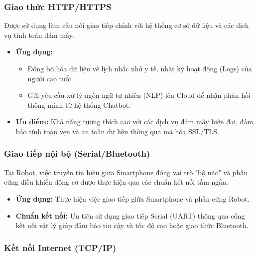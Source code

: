 \subsubsection{Giao thức HTTP/HTTPS}
Được sử dụng làm cầu nối giao tiếp chính với hệ thống cơ sở dữ liệu và các dịch vụ tính toán đám mây.
\begin{itemize}
    \item \textbf{Ứng dụng:} 
    \begin{itemize}
        \item Đồng bộ hóa dữ liệu về lịch nhắc nhở y tế, nhật ký hoạt động (Logs) của người cao tuổi.
        \item Gửi yêu cầu xử lý ngôn ngữ tự nhiên (NLP) lên Cloud để nhận phản hồi thông minh từ hệ thống Chatbot.
    \end{itemize}
    \item \textbf{Ưu điểm:} Khả năng tương thích cao với các dịch vụ đám mây hiện đại, đảm bảo tính toàn vẹn và an toàn dữ liệu thông qua mã hóa SSL/TLS.
\end{itemize}

\subsubsection{Giao tiếp nội bộ (Serial/Bluetooth)}
Tại Robot, việc truyền tín hiệu giữa Smartphone đóng vai trò "bộ não" và phần cứng điều khiển động cơ được thực hiện qua các chuẩn kết nối tầm ngắn.
\begin{itemize}
    \item \textbf{Ứng dụng:} Thực hiện việc giao tiếp giữa Smartphone và phần cứng Robot. 
    \item \textbf{Chuẩn kết nối:} Ưu tiên sử dụng giao tiếp Serial (UART) thông qua cổng kết nối vật lý giúp đảm bảo tin cậy và tốc độ cao hoặc giao thức Bluetooth.
\end{itemize}



\subsubsection{Kết nối Internet (TCP/IP)}

